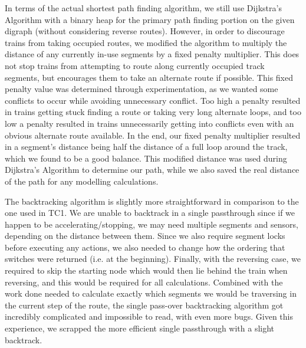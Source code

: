 \documentclass[12pt, titlepage]{article}
\begin{document}
    In terms of the actual shortest path finding algorithm, we still use Dijkstra's Algorithm with a binary heap for the primary path finding portion on the given digraph (without considering reverse routes). However, in order to discourage trains from taking occupied routes, we modified the algorithm to multiply the distance of any currently in-use segments by a fixed penalty multiplier. This does not stop trains from attempting to route along currently occupied track segments, but encourages them to take an alternate route if possible. This fixed penalty value was determined through experimentation, as we wanted some conflicts to occur while avoiding unnecessary conflict. Too high a penalty resulted in trains getting stuck finding a route or taking very long alternate loops, and too low a penalty resulted in trains unnecessarily getting into conflicts even with an obvious alternate route available. In the end, our fixed penalty multiplier resulted in a segment's distance being half the distance of a full loop around the track, which we found to be a good balance. This modified distance was used during Dijkstra's Algorithm to determine our path, while we also saved the real distance of the path for any modelling calculations.
    
    The backtracking algorithm is slightly more straightforward in comparison to the one used in TC1. We are unable to backtrack in a single passthrough since if we happen to be accelerating/stopping, we may need multiple segments and sensors, depending on the distance between them. Since we also require segment locks before executing any actions, we also needed to change how the ordering that switches were returned (i.e. at the beginning). Finally, with the reversing case, we required to skip the starting node which would then lie behind the train when reversing, and this would be required for all calculations. Combined with the work done needed to calculate exactly which segments we would be traversing in the current step of the route, the single pass-over backtracking algorithm got incredibly complicated and impossible to read, with even more bugs. Given this experience, we scrapped the more efficient single passthrough with a slight backtrack.
    
\end{document}

